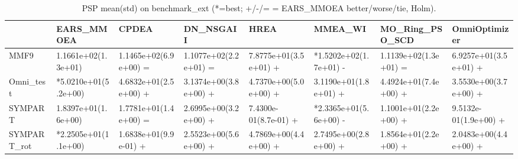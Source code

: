 \begin{table}[t]
\centering
\caption{PSP mean(std) on benchmark_ext (*=best; +/-/= = EARS_MMOEA better/worse/tie, Holm).}
\label{tab:benchmark_ext_PSP}
\begin{tabular}{llllllll}
\toprule
 & EARS\_MMOEA & CPDEA & DN\_NSGAII & HREA & MMEA\_WI & MO\_Ring\_PSO\_SCD & OmniOptimizer \\
\midrule
MMF9 & 1.1661e+02(1.3e+01) & 1.1465e+02(6.9e+00) = & 1.1077e+02(2.2e+01) = & 7.8775e+01(3.5e+01) + & *1.5202e+02(1.7e+01) - & 1.1139e+02(1.3e+01) = & 6.9257e+01(3.5e+01) + \\
Omni\_test & *5.0210e+01(5.2e+00) & 4.6832e+01(2.5e+00) + & 3.1374e+00(3.8e+00) + & 4.7370e+00(5.0e+00) + & 3.1190e+01(1.8e+01) + & 4.4924e+01(7.4e+00) + & 3.5530e+00(3.7e+00) + \\
SYMPART & 1.8397e+01(1.6e+00) & 1.7781e+01(1.4e+00) = & 2.6995e+00(3.2e+00) + & 7.4300e-01(8.7e-01) + & *2.3365e+01(5.6e+00) - & 1.1001e+01(2.2e+00) + & 9.5132e-01(1.9e+00) + \\
SYMPART\_rot & *2.2505e+01(1.1e+00) & 1.6838e+01(9.9e-01) + & 2.5523e+00(5.6e+00) + & 4.7869e+00(4.4e+00) + & 2.7495e+00(2.8e+00) + & 1.8564e+01(2.2e+00) + & 2.0483e+00(4.4e+00) + \\
\bottomrule
\end{tabular}
\end{table}
